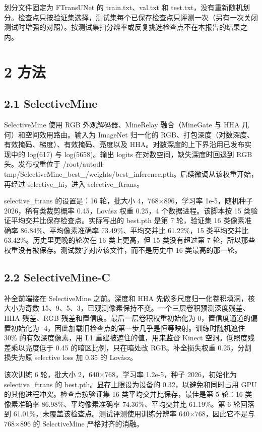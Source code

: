\documentclass[11pt]{article}
\begin{document}
划分文件固定为 FTransUNet 的 train.txt、val.txt 和 test.txt，没有重新随机划分。检查点只按验证集选择，测试集每个已保存检查点只评测一次（另有一次关闭测试时增强的对照）。按测试集扫分辨率或反复挑选检查点不在本报告的结果之内。

\section*{2 方法}
\subsection*{2.1 SelectiveMine}
SelectiveMine 使用 RGB 外观解码器、MineRelay 融合（MineGate 与 HHA 几何）和空间效用路由。输入为 ImageNet 归一化的 RGB、打包深度（对数深度、有效掩码、梯度）、有效掩码、亮度以及 HHA。对数深度的上下界沿用已发布实现中的 log(617) 与 log(5658)。输出 logits 在对数空间，缺失深度时回退到 RGB 头。发布权重位于 /\allowbreak root/\allowbreak autodl-tmp/\allowbreak SelectiveMine\_\allowbreak best\_/\allowbreak weights/\allowbreak best\_\allowbreak inference.pth。后续微调从该权重开始，再经过 selective\_\allowbreak hi，进入 selective\_\allowbreak ftrans。

selective\_\allowbreak ftrans 的设置是：16 轮，批大小 4，768×896，学习率 1e-5，随机种子 2026，稀有类裁剪概率 0.45，Lovász 权重 0.25，4 个数据进程。该脚本按 15 类验证平均交并比保存检查点。实际写出的 best.pth 是第 7 轮，验证集 16 类像素准确率 86.84\%、平均像素准确率 73.49\%、平均交并比 61.22\%，15 类平均交并比 63.42\%。历史里更晚的轮次在 16 类上更高，但 15 类没有超过第 7 轮，所以那些权重没有被保存。测试数字对应该文件，而不是历史中 16 类最高的那一轮。

\subsection*{2.2 SelectiveMine-C}
补全前端接在 SelectiveMine 之前。深度和 HHA 先做多尺度归一化卷积填洞，核大小为奇数 15、9、5、3，已观测像素保持不变。一个三层卷积预测深度残差、HHA 残差、RGB 残差和置信度。最后一层卷积权重初始化为 0，置信度通道的偏置初始化为 -4，因此加载旧检查点的第一步几乎是恒等映射。训练时随机遮住 30\% 的有效深度像素，用 L1 重建被遮住的值，用来监督 Kinect 空洞。低照度残差乘以亮度低于 0.45 的暗区比例，只在暗处改 RGB。补全损失权重 0.25，分割损失为原 selective loss 加 0.35 的 Lovász。

该次训练 6 轮，批大小 2，640×768，学习率 1.2e-5，种子 2026，初始化为 selective\_\allowbreak ftrans 的 best.pth。显存上限设为设备的 0.32，以避免和同时占用 GPU 的其他进程冲突。检查点按验证集 16 类平均交并比保存，最佳是第 5 轮：16 类像素准确率 86.98\%、平均像素准确率 74.36\%、平均交并比 61.19\%。第 6 轮回落到 61.01\%，未覆盖该检查点。测试评测使用训练分辨率 640×768，因此它不是与 768×896 的 SelectiveMine 严格对齐的消融。
\end{document}
